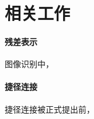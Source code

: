 
\section{相关工作}
\paragraph*{\textbf{残差表示}} \hspace{0pt}
图像识别中，

\paragraph*{\textbf{捷径连接}} \hspace{0pt}
捷径连接被正式提出前，
